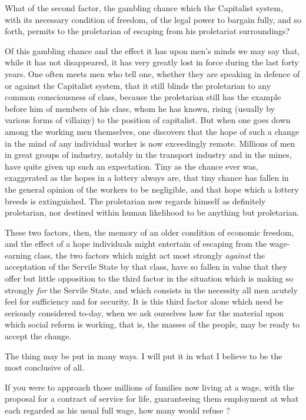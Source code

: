 \documentclass{book}
\begin{document}
What of the second factor, the gambling chance which the Capitalist system, with its necessary condition of freedom, of the legal power to bargain fully, and so forth, permits to the proletarian of escaping from his proletariat surroundings?

Of this gambling chance and the effect it has upon men’s minds we may say that, while it has not disappeared, it has very greatly lost in force during the last forty years. One often meets men who tell one, whether they are speaking in defence of or against the Capitalist system, that it still blinds the proletarian to any common consciousness of class, because the proletarian still has the example before him of members of his class, whom he has known, rising (usually by various forms of villainy) to the position of capitalist. But when one goes down among the working men themselves, one discovers that the hope of such a change in the mind of any individual worker is now exceedingly remote. Millions of men in great groups of industry, notably in the transport industry and in the mines, have quite given up such an expectation. Tiny as the chance ever was, exaggerated as the hopes in a lottery always are, that tiny chance has fallen in the general opinion of the workers to be negligible, and that hope which a lottery breeds is extinguished. The proletarian now regards himself as definitely proletarian, nor destined within human likelihood to be anything but proletarian.

These two factors, then, the memory of an older condition of economic freedom, and the effect of a hope individuals might entertain of escaping from the wage-earning class, the two factors which might act most strongly \emph{against} the acceptation of the Servile State by that class, have so fallen in value that they offer but little opposition to the third factor in the situation which is making so strongly \emph{for} the Servile State, and which consists in the necessity all men acutely feel for sufficiency and for security. It is this third factor alone which need be seriously considered to-day, when we ask ourselves how far the material upon which social reform is working, that is, the masses of the people, may be ready to accept the change.

The thing may be put in many ways. I will put it in what I believe to be the most conclusive of all.

If you were to approach those millions of families now living at a wage, with the proposal for a contract of service for life, guaranteeing them employment at what each regarded as his usual full wage, how many would refuse ?
\end{document}

